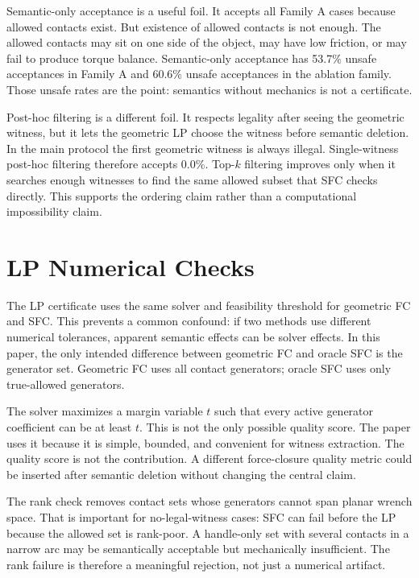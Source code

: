\documentclass{article}
\begin{document}
Semantic-only acceptance is a useful foil. It accepts all Family A cases because allowed contacts exist. But existence of allowed contacts is not enough. The allowed contacts may sit on one side of the object, may have low friction, or may fail to produce torque balance. Semantic-only acceptance has 53.7\% unsafe acceptances in Family A and 60.6\% unsafe acceptances in the ablation family. Those unsafe rates are the point: semantics without mechanics is not a certificate.

Post-hoc filtering is a different foil. It respects legality after seeing the geometric witness, but it lets the geometric LP choose the witness before semantic deletion. In the main protocol the first geometric witness is always illegal. Single-witness post-hoc filtering therefore accepts 0.0\%. Top-\(k\) filtering improves only when it searches enough witnesses to find the same allowed subset that SFC checks directly. This supports the ordering claim rather than a computational impossibility claim.

\section{LP Numerical Checks}

The LP certificate uses the same solver and feasibility threshold for geometric FC and SFC. This prevents a common confound: if two methods use different numerical tolerances, apparent semantic effects can be solver effects. In this paper, the only intended difference between geometric FC and oracle SFC is the generator set. Geometric FC uses all contact generators; oracle SFC uses only true-allowed generators.

The solver maximizes a margin variable \(t\) such that every active generator coefficient can be at least \(t\). This is not the only possible quality score. The paper uses it because it is simple, bounded, and convenient for witness extraction. The quality score is not the contribution. A different force-closure quality metric could be inserted after semantic deletion without changing the central claim.

The rank check removes contact sets whose generators cannot span planar wrench space. That is important for no-legal-witness cases: SFC can fail before the LP because the allowed set is rank-poor. A handle-only set with several contacts in a narrow arc may be semantically acceptable but mechanically insufficient. The rank failure is therefore a meaningful rejection, not just a numerical artifact.
\end{document}
